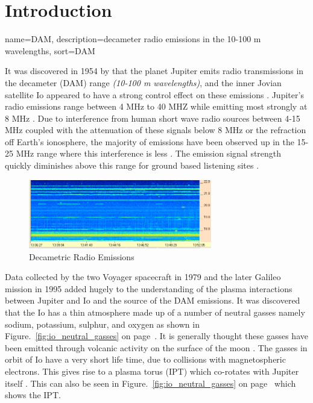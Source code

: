 \newpage
\chapter*{Introduction}

%
{
  name={DAM},
  description={decameter radio emissions in the 10-100 m wavelengths},
  sort=DAM
}
%

It was discovered in 1954 by \cite{burke55} that the planet Jupiter emits radio transmissions in the decameter (\gls{DAM}) range \textit{(10-100 m wavelengths)}, and the inner Jovian satellite Io appeared to have a strong control effect on these emissions \citep{belcher87}. Jupiter's radio emissions range between 4 MHz to 40 MHZ while emitting most strongly at 8 MHz  \citep{wilkinson94}. Due to interference from human short wave radio sources between 4-15 MHz coupled with the attenuation of these signals below 8 MHz or the refraction off Earth's ionosphere, the majority of emissions have been observed up in the 15-25 MHz range where this interference is less \citep{wilkinson94}. The emission signal strength quickly diminishes above this range for ground based listening sites \citep{wilkinson94}.

%
\begin{figure}[here]
\centering
\includegraphics[width=8cm]{images/01}
\caption{Decametric Radio Emissions \citep{ashcraft13}}
\label{fig:dam_Emissions}
\end{figure}
%

Data collected by the two Voyager spacecraft in 1979 \citep{belcher87} and the later Galileo mission in 1995 \citep{kivelson96} added hugely to the understanding of the plasma interactions between Jupiter and Io and the source of the \gls{DAM} emissions. It was discovered that the Io has a thin atmosphere made up of a number of neutral gasses namely sodium, potassium, sulphur, and oxygen as shown in Figure.~\ref{fig:io_neutral_gasses} on page~\pageref{fig:io_neutral_gasses}. It is generally thought these gasses have been emitted through volcanic activity on the surface of the moon \citep{belcher87}. The gasses in orbit of Io have a very short life time, due to collisions with magnetospheric electrons. This gives rise to a plasma torus (\gls{IPT}) which co-rotates with Jupiter itself \citep{belcher87}. This can also be seen in Figure.~\ref{fig:io_neutral_gasses} on page~\pageref{fig:io_neutral_gasses} which shows the \gls{IPT}.

